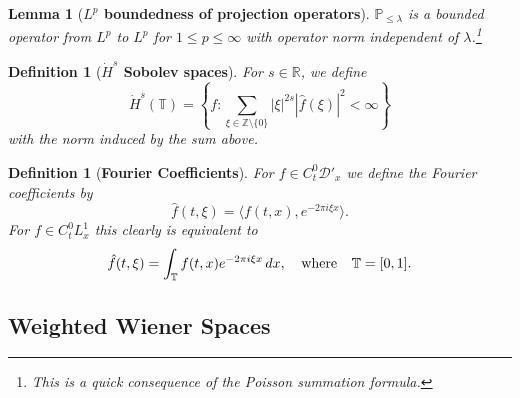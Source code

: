 \documentclass[12pt,reqno,letterpaper]{amsart}
\numberwithin{equation}{section}
\newcommand{\1}{{\bf 1}}
\newcommand{\2}{{\bf 2}}
\newcommand{\R}{\mathbb R}
\newcommand{\T}{\mathbb T}
\newcommand{\Z}{\mathbb Z}
\newtheorem{definition}[theorem]{Definition}
\newtheorem{lemma}[theorem]{Lemma}
\theoremstyle{remark}
\newtheorem{remark}[theorem]{Remark}
\theoremstyle{remark}
\begin{document}
\begin{lemma}[\textbf{$L^p$ boundedness of projection operators}]\label{lem:proj}
    $\mathbb{P}_{\leq \lambda}$ is a bounded operator from $L^p$ to $L^p$ for $1 \leq p \leq \infty$ with operator norm independent of $\lambda$.\footnote{This is a quick consequence of the Poisson summation formula.}
\end{lemma}



\begin{definition}[\textbf{$\dot H^s$ Sobolev spaces}] For $s \in \mathbb{R}$, we define
    $$\dot{H}^{s}(\mathbb{T})=\left\{ f: \sum_{\xi \in \Z \setminus \{0\}}|\xi|^{2s}|\hat{f}(\xi)|^2<\infty\right\}  $$
    with the norm induced by the sum above.
\end{definition}

\begin{definition}[\textbf{Fourier Coefficients}]
    For $f \in C_t^0 \mathcal{D}'_x$ we define the Fourier coefficients by
    $$
    \hat{f}(t,\xi) = \langle f(t,x), e^{-2\pi i \xi x}\rangle.
    $$
    For $f\in C_t^0L^1_x$ this clearly is equivalent to
    \[\hat{f}(t,\xi)=\int_{\T}f(t,x)e^{-2\pi i\xi x}\,dx, \hspace{0.25cm} \text{ where } \hspace{0.25cm} \T=[0,1].\]
\end{definition}



\subsection{Weighted Wiener Spaces}\label{sec:wws}
\end{document}
